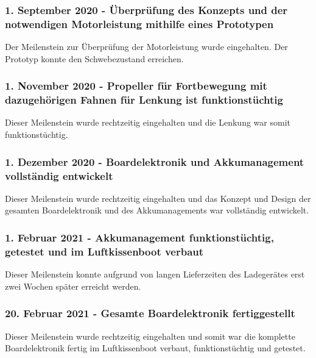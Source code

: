 
\subsubsection*{1. September 2020 - Überprüfung des Konzepts und der notwendigen Motorleistung mithilfe eines Prototypen}
Der Meilenstein zur Überprüfung der Motorleistung wurde eingehalten. Der Prototyp konnte den Schwebezustand erreichen. \\

\subsubsection*{1. November 2020 - Propeller für Fortbewegung mit dazugehörigen Fahnen für Lenkung ist funktionstüchtig}
Dieser Meilenstein wurde rechtzeitig eingehalten und die Lenkung war somit \\ funktionstüchtig. \\

\subsubsection*{1. Dezember 2020 - Boardelektronik und  Akkumanagement vollständig entwickelt}
Dieser Meilenstein wurde rechtzeitig eingehalten und das Konzept und Design der gesamten Boardelektronik und des Akkumanagements war vollständig entwickelt. \\

\subsubsection*{1. Februar 2021 - Akkumanagement funktionstüchtig, getestet und im Luftkissenboot verbaut}
Dieser Meilenstein konnte aufgrund von langen Lieferzeiten des Ladegerätes erst zwei Wochen später erreicht werden. \\

\subsubsection*{20. Februar 2021 - Gesamte Boardelektronik fertiggestellt}
Dieser Meilenstein wurde rechtzeitig eingehalten und somit war die komplette \\ Boardelektronik fertig im Luftkissenboot verbaut, funktionstüchtig und getestet. \\ 

